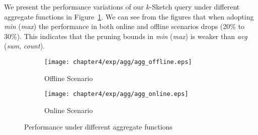 We present the performance variations of our $k$-Sketch query under different aggregate functions in Figure~\ref{exp:agg_cmp}. We can see from the figures that when adopting \emph{min} (\emph{max}) the performance in both online and offline scenarios drops (20\% to 30\%). This indicates that the pruning bounds in \emph{min} (\emph{max}) is weaker than \emph{avg} (\emph{sum}, \emph{count}).

\begin{figure}[h]
\centering
    \begin{subfigure}[b]{0.45\textwidth}
        \texttt{[image: chapter4/exp/agg/agg\_offline.eps]}
        \vspace{-1.5em}
        \caption{Offline Scenario}
    \end{subfigure}
    \begin{subfigure}[b]{0.45\textwidth}
        \texttt{[image: chapter4/exp/agg/agg\_online.eps]}
        \vspace{-1.5em}
        \caption{Online Scenario}
    \end{subfigure}
\caption{Performance under different aggregate functions} 
\label{exp:agg_cmp}
\end{figure}








